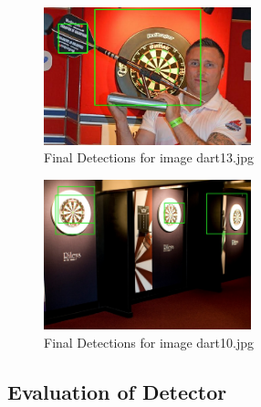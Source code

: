 \documentclass[conference]{IEEEtran}
\begin{document}
\begin{figure}[ht!]
	\centering
	\includegraphics[width=60mm]{img/Task3_Images/detected_dart13.jpg}
	\caption{Final Detections for image dart13.jpg \label{img_dart_1}}
\end{figure}

\begin{figure}[ht!]
	\centering
	\includegraphics[width=60mm]{img/Task3_Images/detected_dart10.jpg}
	\caption{Final Detections for image dart10.jpg \label{img_dart_1}}
\end{figure}

\subsection{Evaluation of Detector}
\end{document}
